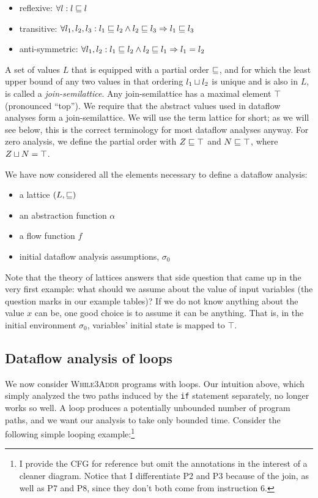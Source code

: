 \documentclass[11pt]{article}
\begin{document}
\begin{itemize}[labelwidth=0.7em, labelsep=0.6em, topsep=0ex, itemsep=0ex,
  parsep=0ex]
\item reflexive: $\forall l : l \sqsubseteq l$
\item transitive: $\forall l_1, l_2, l_3 : l_1 \sqsubseteq l_2 \land l_2 \sqsubseteq l_3 \Rightarrow l_1 \sqsubseteq l_3$
\item anti-symmetric: $\forall l_1, l_2 : l_1 \sqsubseteq l_2 \land l_2 \sqsubseteq l_1 \Rightarrow l_1 = l_2$
\end{itemize}

A set of values $L$ that is equipped with a partial order $\sqsubseteq$, and for which
the least upper bound of any two values in that ordering $l_1 \sqcup l_2$ is
unique and is also in $L$, is called a \textit{join-semilattice}.  Any
join-semilattice has a maximal element $\top$ (pronounced ``top'').  We require
that the abstract values used in dataflow analyses form a join-semilattice.  We
will use the term lattice for short; as we will see below, this is the correct
terminology for most dataflow analyses anyway.
%
For zero analysis, we define the partial order with $Z \sqsubseteq \top$ and $N \sqsubseteq
\top $, where $Z \sqcup N = \top$.


We have now considered all the elements necessary to define a
dataflow analysis:

\begin{itemize}[labelwidth=0.7em, labelsep=0.6em, topsep=0ex, itemsep=0ex,
  parsep=0ex]
\item a lattice $(L,\sqsubseteq)$
\item an abstraction function $\alpha$
\item a flow function $f$
\item initial dataflow analysis assumptions, $\sigma_0$
\end{itemize}

Note that the theory of lattices answers that side question that came up in the
very first example: what should we assume
about the value of input variables (the question marks in our example tables)? 
If we do not know anything about the value $x$ can be,
one good choice is to assume it can be anything. That is, in the initial
environment $\sigma_0$, variables' initial state is mapped to $\top$.  

\subsection{Dataflow analysis of loops}

We now consider \textsc{While3Addr} programs with loops. Our intuition above,
which simply analyzed the two paths induced by the \texttt{if} statement
separately, no longer works so well.  A loop produces a potentially unbounded
number of program paths, and we want our analysis to take only bounded
time. Consider the following simple
looping example:\footnote{I provide the CFG for reference but omit the
  annotations in the interest of a cleaner diagram.  Notice that I differentiate
  P2 and P3 because of the join, as well as P7 and P8,
  since they don't both come from instruction 6.}
\end{document}
